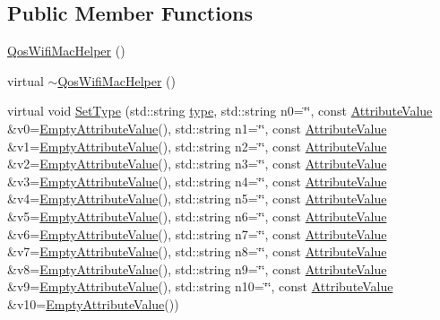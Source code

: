 \subsection*{Public Member Functions}
\begin{DoxyCompactItemize}
\item 
\hyperlink{classns3_1_1QosWifiMacHelper_a66d0a2374c45da79e02e0ce0d3148aa6}{Qos\+Wifi\+Mac\+Helper} ()
\item 
virtual \hyperlink{classns3_1_1QosWifiMacHelper_afedb8b9aa8285fefba9813dfcbda40e3}{$\sim$\+Qos\+Wifi\+Mac\+Helper} ()
\item 
virtual void \hyperlink{classns3_1_1QosWifiMacHelper_a8305c954cf35f5bfed68a27c3f5789f7}{Set\+Type} (std\+::string \hyperlink{visualizer-ideas_8txt_add98db9e15e2a58cf2b57623e7aa893a}{type}, std\+::string n0=\char`\"{}\char`\"{}, const \hyperlink{classns3_1_1AttributeValue}{Attribute\+Value} \&v0=\hyperlink{classns3_1_1EmptyAttributeValue}{Empty\+Attribute\+Value}(), std\+::string n1=\char`\"{}\char`\"{}, const \hyperlink{classns3_1_1AttributeValue}{Attribute\+Value} \&v1=\hyperlink{classns3_1_1EmptyAttributeValue}{Empty\+Attribute\+Value}(), std\+::string n2=\char`\"{}\char`\"{}, const \hyperlink{classns3_1_1AttributeValue}{Attribute\+Value} \&v2=\hyperlink{classns3_1_1EmptyAttributeValue}{Empty\+Attribute\+Value}(), std\+::string n3=\char`\"{}\char`\"{}, const \hyperlink{classns3_1_1AttributeValue}{Attribute\+Value} \&v3=\hyperlink{classns3_1_1EmptyAttributeValue}{Empty\+Attribute\+Value}(), std\+::string n4=\char`\"{}\char`\"{}, const \hyperlink{classns3_1_1AttributeValue}{Attribute\+Value} \&v4=\hyperlink{classns3_1_1EmptyAttributeValue}{Empty\+Attribute\+Value}(), std\+::string n5=\char`\"{}\char`\"{}, const \hyperlink{classns3_1_1AttributeValue}{Attribute\+Value} \&v5=\hyperlink{classns3_1_1EmptyAttributeValue}{Empty\+Attribute\+Value}(), std\+::string n6=\char`\"{}\char`\"{}, const \hyperlink{classns3_1_1AttributeValue}{Attribute\+Value} \&v6=\hyperlink{classns3_1_1EmptyAttributeValue}{Empty\+Attribute\+Value}(), std\+::string n7=\char`\"{}\char`\"{}, const \hyperlink{classns3_1_1AttributeValue}{Attribute\+Value} \&v7=\hyperlink{classns3_1_1EmptyAttributeValue}{Empty\+Attribute\+Value}(), std\+::string n8=\char`\"{}\char`\"{}, const \hyperlink{classns3_1_1AttributeValue}{Attribute\+Value} \&v8=\hyperlink{classns3_1_1EmptyAttributeValue}{Empty\+Attribute\+Value}(), std\+::string n9=\char`\"{}\char`\"{}, const \hyperlink{classns3_1_1AttributeValue}{Attribute\+Value} \&v9=\hyperlink{classns3_1_1EmptyAttributeValue}{Empty\+Attribute\+Value}(), std\+::string n10=\char`\"{}\char`\"{}, const \hyperlink{classns3_1_1AttributeValue}{Attribute\+Value} \&v10=\hyperlink{classns3_1_1EmptyAttributeValue}{Empty\+Attribute\+Value}())

\end{DoxyCompactItemize}
